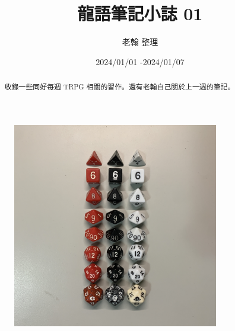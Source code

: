 \documentclass[10pt, a5paper]{article}
\title{龍語筆記小誌 01}
\author{老翰 整理}
\date{2024/01/01 -2024/01/07}
\begin{document}
\begin{CJK}{UTF8}{bsmi}



\maketitle

\thispagestyle{empty} %


\begin{figure}[h]
    \centering
    \includegraphics[width=9cm, keepaspectratio]{imgs/zine_issue01_dice2014.jpg}
    \label{fig:封面}
\end{figure}

\vfill

\renewcommand{\abstractname}{} %
\renewcommand{\contentsname}{目錄} %
\renewcommand{\figurename}{圖} %

\begin{abstract}
收錄一些同好每週 TRPG 相關的習作。還有老翰自己關於上一週的筆記。
\end{abstract}

\newcommand{\contactmethod}{
\begin{center}
\noindent\begin{tabular}{|| l ||}
\hline
投稿或相關問題，可以使用以下方式聯絡\\
Email ： dragonicnotes@gmail.com\\
\hline
\end{tabular}
\end{center}
}


\end{CJK}
\end{document}
